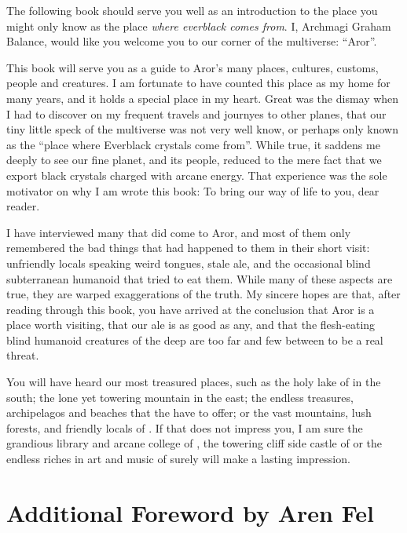 The following book should serve you well as an introduction to the place you
might only know as the place \emph{where everblack comes from}. I, Archmagi
Graham Balance, would like you welcome you to our corner of the multiverse:
``Aror''.

This book will serve you as a guide to Aror's many places, cultures, customs,
people and creatures. I am fortunate to have counted this place as my home for
many years, and it holds a special place in my heart. Great was the dismay
when I had to discover on my frequent travels and journyes to other planes,
that our tiny little speck of the multiverse was not very well know, or
perhaps only known as the ``place where Everblack crystals come from''. While
true, it saddens me deeply to see our fine planet, and its people, reduced to
the mere fact that we export black crystals charged with arcane energy. That
experience was the sole motivator on why I am wrote this book: To bring our
way of life to you, dear reader.

I have interviewed many that did come to Aror, and most of them only
remembered the bad things that had happened to them in their short visit:
unfriendly locals speaking weird tongues, stale ale, and the occasional blind
subterranean humanoid that tried to eat them. While many of these aspects are
true, they are warped exaggerations of the truth. My sincere hopes are that,
after reading through this book, you have arrived at the conclusion that Aror
is a place worth visiting, that our ale is as good as any, and that the
flesh-eating blind humanoid creatures of the deep are too far and few between
to be a real threat.

You will have heard our most treasured places, such as the holy lake of
 in the south; the lone yet towering 
mountain in the east; the endless treasures, archipelagos and beaches that the
 have to offer; or the vast mountains, lush forests,
and friendly locals of . If that does not impress you,
I am sure the grandious library and arcane college of , the towering cliff side castle of  or the
endless riches in art and music of  surely will make a
lasting impression.

\section{Additional Foreword by Aren Fel}

